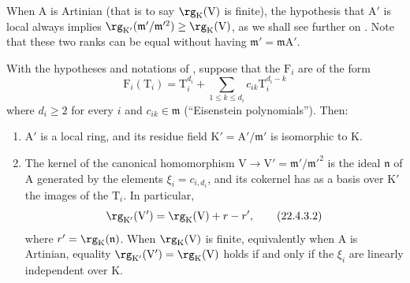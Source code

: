\begin{remark}[22.4.2]
\label{0.22.4.2}
When $\mathrm{A}$ is Artinian (that is to say $\rg_\mathrm{K}(\mathrm{V})$ is finite), the hypothesis that $\mathrm{A}'$ is local always implies $\rg_{\mathrm{K}'}(\mathfrak{m}'/\mathfrak{m}'^2)\geq\rg_\mathrm{K}(\mathrm{V})$, as we shall see further on .
Note that these two ranks can be equal without having $\mathfrak{m}'=\mathfrak{m}\mathrm{A}'$.
\end{remark}

\begin{proposition}[22.4.3]
\label{0.22.4.3}
With the hypotheses and notations of , suppose that the $\mathrm{F}_i$ are of the form
\[
\label{0.22.4.3.1}
  \mathrm{F}_i(\mathrm{T}_i)=\mathrm{T}_i^{d_i}+\sum_{1\leq k\leq d_i}c_{ik}\mathrm{T}_i^{d_i-k}
  \tag{22.4.3.1}
\]
where $d_i\geq 2$ for every $i$ and $c_{ik}\in\mathfrak{m}$ (``Eisenstein polynomials'').
Then:
\begin{enumerate}
  \item[\rm{(i)}] $\mathrm{A}'$ is a local ring, and its residue field $\mathrm{K}'=\mathrm{A}'/\mathfrak{m}'$ is isomorphic to $\mathrm{K}$.


  \item[\rm{(ii)}] The kernel of the canonical homomorphism $\mathrm{V}\to\mathrm{V}'=\mathfrak{m}'/\mathfrak{m}'^2$ is the ideal $\mathfrak{n}$ of $\mathrm{A}$ generated by the elements $\xi_i=c_{i,d_i}$, and its cokernel has as a basis over $\mathrm{K}'$ the images of the $\mathrm{T}_i$.
  In particular,
  \begin{equation}
  \label{0.22.4.3.2}
    \rg_{\mathrm{K}'}(\mathrm{V}')=\rg_\mathrm{K}(\mathrm{V})+r-r',
    \tag{22.4.3.2}
  \end{equation}
  where $r'=\rg_\mathrm{K}(\mathfrak{n})$.
  When $\rg_\mathrm{K}(\mathrm{V})$ is finite, equivalently when $\mathrm{A}$ is Artinian, equality $\rg_{\mathrm{K}'}(\mathrm{V}')=\rg_\mathrm{K}(\mathrm{V})$ holds if and only if the $\xi_i$ are linearly independent over $\mathrm{K}$.
\end{enumerate}
\end{proposition}

